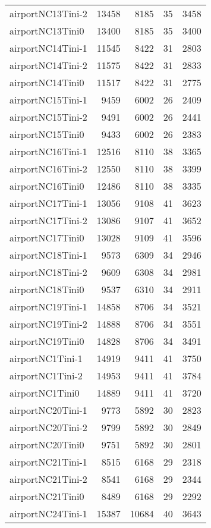 \begin{longtable}{lrrrr}
airportNC13Tini-2 & 13458 & 8185 & 35 & 3458 \\
airportNC13Tini0 & 13400 & 8185 & 35 & 3400 \\
airportNC14Tini-1 & 11545 & 8422 & 31 & 2803 \\
airportNC14Tini-2 & 11575 & 8422 & 31 & 2833 \\
airportNC14Tini0 & 11517 & 8422 & 31 & 2775 \\
airportNC15Tini-1 & 9459 & 6002 & 26 & 2409 \\
airportNC15Tini-2 & 9491 & 6002 & 26 & 2441 \\
airportNC15Tini0 & 9433 & 6002 & 26 & 2383 \\
airportNC16Tini-1 & 12516 & 8110 & 38 & 3365 \\
airportNC16Tini-2 & 12550 & 8110 & 38 & 3399 \\
airportNC16Tini0 & 12486 & 8110 & 38 & 3335 \\
airportNC17Tini-1 & 13056 & 9108 & 41 & 3623 \\
airportNC17Tini-2 & 13086 & 9107 & 41 & 3652 \\
airportNC17Tini0 & 13028 & 9109 & 41 & 3596 \\
airportNC18Tini-1 & 9573 & 6309 & 34 & 2946 \\
airportNC18Tini-2 & 9609 & 6308 & 34 & 2981 \\
airportNC18Tini0 & 9537 & 6310 & 34 & 2911 \\
airportNC19Tini-1 & 14858 & 8706 & 34 & 3521 \\
airportNC19Tini-2 & 14888 & 8706 & 34 & 3551 \\
airportNC19Tini0 & 14828 & 8706 & 34 & 3491 \\
airportNC1Tini-1 & 14919 & 9411 & 41 & 3750 \\
airportNC1Tini-2 & 14953 & 9411 & 41 & 3784 \\
airportNC1Tini0 & 14889 & 9411 & 41 & 3720 \\
airportNC20Tini-1 & 9773 & 5892 & 30 & 2823 \\
airportNC20Tini-2 & 9799 & 5892 & 30 & 2849 \\
airportNC20Tini0 & 9751 & 5892 & 30 & 2801 \\
airportNC21Tini-1 & 8515 & 6168 & 29 & 2318 \\
airportNC21Tini-2 & 8541 & 6168 & 29 & 2344 \\
airportNC21Tini0 & 8489 & 6168 & 29 & 2292 \\
airportNC24Tini-1 & 15387 & 10684 & 40 & 3643 \\

\end{longtable}
